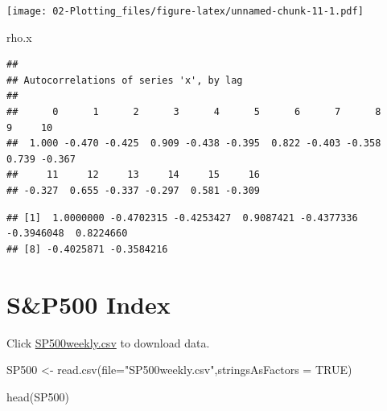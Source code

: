 \documentclass[
]{book}
\newenvironment{Shaded}{\begin{snugshade}}{\end{snugshade}}
\newcommand{\AttributeTok}[1]{\textcolor[rgb]{0.77,0.63,0.00}{#1}}
\newcommand{\ConstantTok}[1]{\textcolor[rgb]{0.00,0.00,0.00}{#1}}
\newcommand{\DecValTok}[1]{\textcolor[rgb]{0.00,0.00,0.81}{#1}}
\newcommand{\FunctionTok}[1]{\textcolor[rgb]{0.00,0.00,0.00}{#1}}
\newcommand{\NormalTok}[1]{#1}
\newcommand{\OtherTok}[1]{\textcolor[rgb]{0.56,0.35,0.01}{#1}}
\newcommand{\SpecialCharTok}[1]{\textcolor[rgb]{0.00,0.00,0.00}{#1}}
\newcommand{\StringTok}[1]{\textcolor[rgb]{0.31,0.60,0.02}{#1}}
\theoremstyle{definition}
\theoremstyle{definition}
\theoremstyle{definition}
\theoremstyle{definition}
\theoremstyle{remark}
\begin{document}
\texttt{[image: 02-Plotting\_files/figure-latex/unnamed-chunk-11-1.pdf]}

\begin{Shaded}
\begin{Highlighting}[]
\NormalTok{rho.x}
\end{Highlighting}
\end{Shaded}

\begin{verbatim}
## 
## Autocorrelations of series 'x', by lag
## 
##      0      1      2      3      4      5      6      7      8      9     10 
##  1.000 -0.470 -0.425  0.909 -0.438 -0.395  0.822 -0.403 -0.358  0.739 -0.367 
##     11     12     13     14     15     16 
## -0.327  0.655 -0.337 -0.297  0.581 -0.309
\end{verbatim}

\begin{Shaded}
\end{Shaded}

\begin{verbatim}
## [1]  1.0000000 -0.4702315 -0.4253427  0.9087421 -0.4377336 -0.3946048  0.8224660
## [8] -0.4025871 -0.3584216
\end{verbatim}

\hypertarget{sp500-index}{%
\section{S\&P500 Index}\label{sp500-index}}

Click \href{http://www.chrisbilder.com/stat878/sections/2/SP500weekly.csv}{SP500weekly.csv} to download data.

\begin{Shaded}
\begin{Highlighting}[]
\NormalTok{SP500 }\OtherTok{\textless{}{-}} \FunctionTok{read.csv}\NormalTok{(}\AttributeTok{file=}\StringTok{"SP500weekly.csv"}\NormalTok{,}\AttributeTok{stringsAsFactors =} \ConstantTok{TRUE}\NormalTok{)}
\end{Highlighting}
\end{Shaded}

\begin{Shaded}
\begin{Highlighting}[]
\FunctionTok{head}\NormalTok{(SP500)}
\end{Highlighting}
\end{Shaded}
\end{document}

